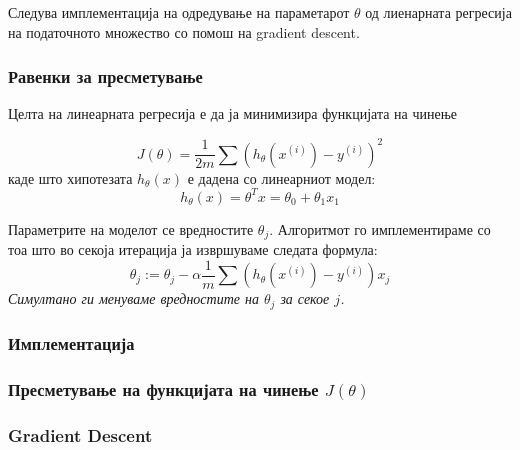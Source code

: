 \documentclass[12pt,a4paper]{article}
\begin{document}
Следува имплементација на одредување на параметарот $\theta$ од лиенарната
регресија на податочното множество со помош на gradient descent.

\subsubsection{Равенки за пресметување}

Целта на линеарната регресија е да ја минимизира функцијата на чинење

\[
	J(\theta) = \frac{1}{2m}\sum{(h_\theta(x^{(i)}) - y^{(i)})^2}
\]
каде што хипотезата $h_\theta(x)$ е дадена со линеарниот модел:
\[
	h_\theta(x) = \theta^Tx = \theta_0 + \theta_1x_1
\]

Параметрите на моделот се вредностите $\theta_j$.
Алгоритмот го имплементираме со тоа што во секоја итерација ја извршуваме
следата формула:
\[
	\theta_j := \theta_j - \alpha\frac{1}{m}\sum{(h_\theta(x^{(i)}) - y^{(i)}) x_j}
\]
\emph{Симултано ги менуваме вредностите на $\theta_j$ за секое $j$.}

\subsubsection{Имплементација}



\subsubsection{Пресметување на функцијата на чинење $J(\theta)$}



\subsubsection{Gradient Descent}


\end{document}
